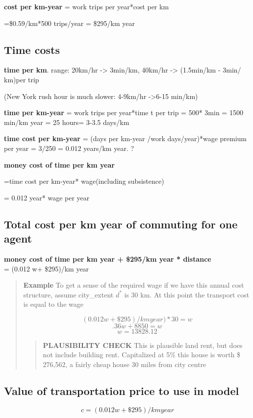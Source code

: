 \textbf{cost per km-year} = work trips per year*cost per km

=\$0.59/km*500 trips/year  =  \$295/km year 



\subsection{Time costs}
\textbf{time per km}. range: 20km/hr -> 3min/km, 40km/hr -> (1.5min/km - 3min/ km)per trip 

(New York rush hour is much slower:  4-9km/hr ->6-15 min/km)

\textbf{time  per km-year} = work trips per year*time t per trip = 500* 3min  = 1500 min/km year = 25 hours= 3-3.5 days/km
 
\textbf{time cost per km-year} =  (days per km-year /work days/year)*wage premium per year  = 3/250 = 0.012 years/km year. ?

\textbf{money cost of time per km year} 

=time cost per km-year* wage(including subsistence) 

= 0.012 year* wage per year

\subsection{Total cost per km year of commuting for one agent}
\textbf{money cost of time per km year + \$295/km year * distance} \\
= (0.012 w+ \$295)/km year 
    \begin{quotation}
    \textbf{Example}
    To get a sense of the required wage if we have this annual cost structure, assume city\_extent $d^*$ is 30 km. At this point the transport cost is equal to the wage

\[(0.012 w+ \$295)/km year)*30 =  w\] 
\[.36w+ 8850=w\]
\[w=13828.12\]
        \begin{quotation}
        \textbf{PLAUSIBILITY CHECK}
This is plausible land rent, but does not include building rent. 
Capitalized at 5\% this house is worth \$ 276,562, a fairly cheap house 30 miles from city centre
        \end{quotation}
    \end{quotation}



\subsection{Value of transportation price to use in model}
\[ {c}=(0.012 w+ \$295)/km year \]



